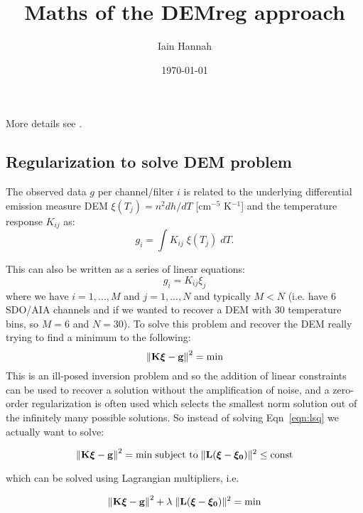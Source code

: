 \documentclass[12pt,a4paper]{article}
\title{Maths of the DEMreg approach}
\author{Iain Hannah}
\date{\today}
\begin{document}
\maketitle\thispagestyle{fancy}

More details see \citet{2012A&A...539A.146H,2013A&A...553A..10H,2004SoPh..225..293K,1992InvPr...8..849H}.

\vspace{-10pt}
\subsection*{Regularization to solve DEM problem}

The observed data $g$ per channel/filter $i$ is related to the underlying differential emission measure DEM $\xi(T_j)=n^2 dh/dT$ [cm$^{-5}$ K$^{-1}$] and the temperature response $K_{ij}$ as:
\begin{equation}\label{eqn:org}
    g_i=\int K_{ij}\;\xi(T_j)\; dT.
\end{equation}

This can also be written as a series of linear equations:
\begin{equation}\label{eqn:le}
    g_i=K_{ij}\xi_j
\end{equation}
where we have $i=1,...,M$ and $j=1,...,N$ and typically $M<N$ (i.e. have 6 SDO/AIA channels and if we wanted to recover a DEM with 30 temperature bins, so $M=6$ and $N=30$). To solve this problem and recover the DEM really trying to find a minimum to the following:
\begin{equation}\label{eqn:lsq}
    \left\|\bf{K\boldsymbol{\xi}-g}\right\|^2=\mbox{min}
\end{equation}
This is an ill-posed inversion problem and so the addition of linear constraints can be used to recover a solution without the amplification of noise, and a zero-order regularization is often used which selects the smallest norm solution out of the infinitely many possible solutions. So instead of solving Eqn~\ref{eqn:lsq} we actually want to solve:

\begin{equation}
    \left\|\bf{K\boldsymbol{\xi}-g}\right\|^2  =  \mathrm{min}  \;
\mbox{subject to} \; \| {\bf L (\boldsymbol{\xi}-\boldsymbol{\xi_0})}\|^2\le \mathrm{const}
\end{equation}

which can be solved using Lagrangian multipliers, i.e.

\begin{equation}\label{eqn:lc}
    \left\|\bf{K\boldsymbol{\xi}-g}\right\|^2 +\lambda\;\| {\bf L (\boldsymbol{\xi}-\boldsymbol{\xi_0})}\|^2=\mathrm{min}
\end{equation}
\end{document}
